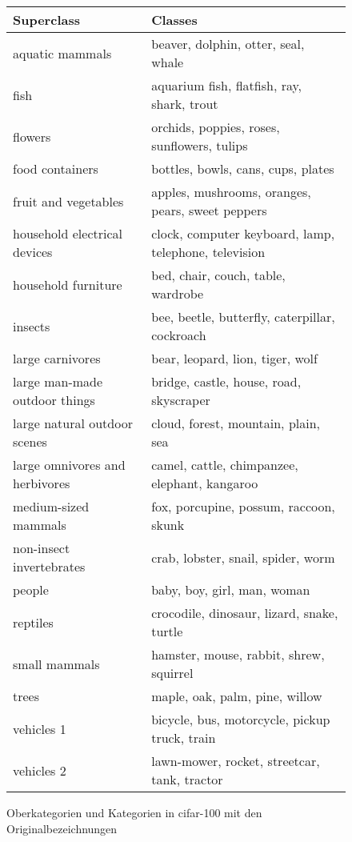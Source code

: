 \begin{figure}
    \begin{tabular} {l l} 
        \hline
        Superclass &	Classes\\
        \hline
        aquatic mammals & 	beaver, dolphin, otter, seal, whale\\
        fish & 	aquarium fish, flatfish, ray, shark, trout\\
        flowers & 	orchids, poppies, roses, sunflowers, tulips\\
        food containers &	bottles, bowls, cans, cups, plates\\
        fruit and vegetables &	apples, mushrooms, oranges, pears, sweet peppers\\
        household electrical devices &	clock, computer keyboard, lamp, telephone, television\\
        household furniture &	bed, chair, couch, table, wardrobe\\
        insects &	bee, beetle, butterfly, caterpillar, cockroach\\
        large carnivores &	bear, leopard, lion, tiger, wolf\\
        large man-made outdoor things &	bridge, castle, house, road, skyscraper\\
        large natural outdoor scenes &	cloud, forest, mountain, plain, sea\\
        large omnivores and herbivores &	camel, cattle, chimpanzee, elephant, kangaroo\\
        medium-sized mammals &	fox, porcupine, possum, raccoon, skunk\\
        non-insect invertebrates &	crab, lobster, snail, spider, worm\\
        people &	baby, boy, girl, man, woman\\
        reptiles &	crocodile, dinosaur, lizard, snake, turtle\\
        small mammals &	hamster, mouse, rabbit, shrew, squirrel\\
        trees &	maple, oak, palm, pine, willow\\
        vehicles 1 &	bicycle, bus, motorcycle, pickup truck, train\\
        vehicles 2 &	lawn-mower, rocket, streetcar, tank, tractor\\
    \end{tabular}
    \caption{Oberkategorien und Kategorien in \ac{cifar}-100 mit den Originalbezeichnungen}
    \label{TabCIF100}
    
\end{figure}


